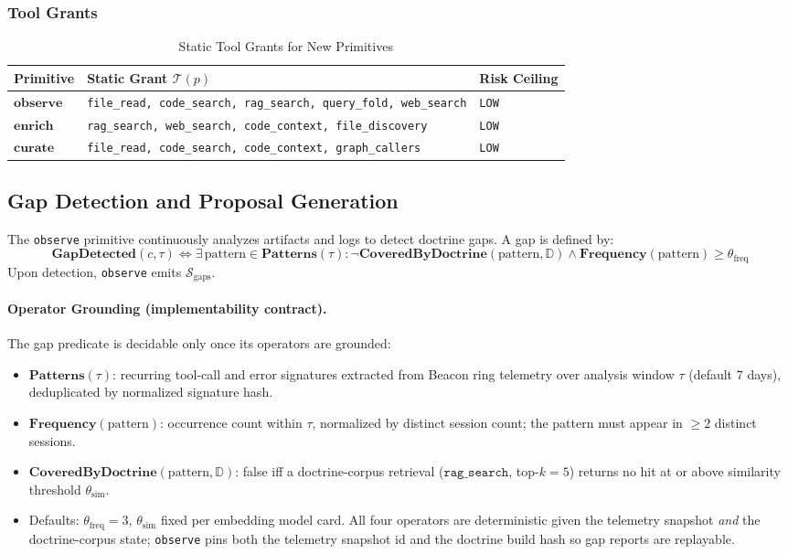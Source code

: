 \documentclass[11pt]{article}
\begin{document}
\subsubsection{Tool Grants}
\begin{table}[H]
\centering
\caption{Static Tool Grants for New Primitives}
\begin{tabular}{@{}lll@{}}
\toprule
\textbf{Primitive} & \textbf{Static Grant $\mathcal{T}(p)$} & \textbf{Risk Ceiling} \\
\midrule
$\mathbf{observe}$ & \texttt{file\_read, code\_search, rag\_search, query\_fold, web\_search} & \texttt{LOW} \\
$\mathbf{enrich}$ & \texttt{rag\_search, web\_search, code\_context, file\_discovery} & \texttt{LOW} \\
$\mathbf{curate}$ & \texttt{file\_read, code\_search, code\_context, graph\_callers} & \texttt{LOW} \\
\bottomrule
\end{tabular}
\end{table}

\subsection{Gap Detection and Proposal Generation}
The \texttt{observe} primitive continuously analyzes artifacts and logs to detect doctrine gaps. A gap is defined by:
\[
\mathbf{GapDetected}(c, \tau) \iff \exists\, \text{pattern} \in \mathbf{Patterns}(\tau) : \neg \mathbf{CoveredByDoctrine}(\text{pattern}, \mathbb{D}) \land \mathbf{Frequency}(\text{pattern}) \ge \theta_{\text{freq}}
\]
Upon detection, \texttt{observe} emits $\mathcal{S}_{\text{gaps}}$.

\paragraph{Operator Grounding (implementability contract).}
The gap predicate is decidable only once its operators are grounded:
\begin{itemize}
    \item $\mathbf{Patterns}(\tau)$: recurring tool-call and error signatures
        extracted from Beacon ring telemetry over analysis window $\tau$
        (default $7$ days), deduplicated by normalized signature hash.
    \item $\mathbf{Frequency}(\text{pattern})$: occurrence count within $\tau$,
        normalized by distinct session count; the pattern must appear in
        $\ge 2$ distinct sessions.
    \item $\mathbf{CoveredByDoctrine}(\text{pattern}, \mathbb{D})$: false iff a
        doctrine-corpus retrieval ($\texttt{rag\_search}$, top-$k=5$) returns
        no hit at or above similarity threshold $\theta_{\text{sim}}$.
    \item Defaults: $\theta_{\text{freq}} = 3$, $\theta_{\text{sim}}$ fixed per
        embedding model card. All four operators are deterministic given the
        telemetry snapshot \emph{and} the doctrine-corpus state;
        \texttt{observe} pins both the telemetry snapshot id and the doctrine
        build hash so gap reports are replayable.
\end{itemize}
\end{document}
